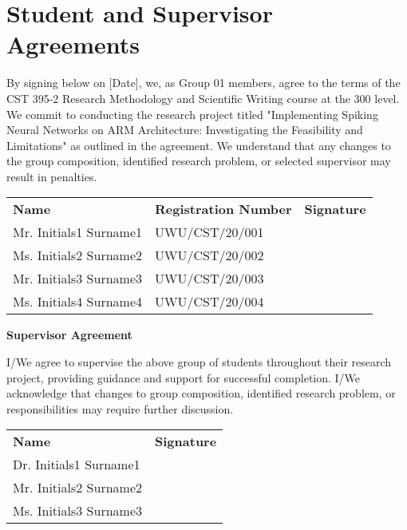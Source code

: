 \documentclass[a4paper,12pt]{article}
\begin{document}
	\section*{Student and Supervisor Agreements}
	{\normalsize By signing below on [Date], we, as Group 01 members, agree to the terms of the CST 395-2 Research Methodology and Scientific Writing course at the 300 level. We commit to conducting the research project titled "Implementing Spiking Neural Networks on ARM Architecture: Investigating the Feasibility and Limitations" as outlined in the agreement. We understand that any changes to the group composition, identified research problem, or selected supervisor may result in penalties. \par}
	\vspace{0.5cm}
	\begin{tabular}{l l l}
		\textbf{Name} & \textbf{Registration Number} & \textbf{Signature} \\
		Mr. Initials1 Surname1 & UWU/CST/20/001 & \\
		Ms. Initials2 Surname2 & UWU/CST/20/002 & \\
		Mr. Initials3 Surname3 & UWU/CST/20/003 & \\
		Ms. Initials4 Surname4 & UWU/CST/20/004 & \\
	\end{tabular}
	\vspace{0.5cm}
	{\normalsize \textbf{Supervisor Agreement} \par}
	{\normalsize I/We agree to supervise the above group of students throughout their research project, providing guidance and support for successful completion. I/We acknowledge that changes to group composition, identified research problem, or responsibilities may require further discussion. \par}
	\vspace{0.5cm}
	\begin{tabular}{l l}
		\textbf{Name} & \textbf{Signature} \\
		Dr. Initials1 Surname1 & \\
		Mr. Initials2 Surname2 & \\
		Ms. Initials3 Surname3 & \\
	\end{tabular}
	\cleardoublepage
	
	\tableofcontents
	\cleardoublepage
	
\end{document}
